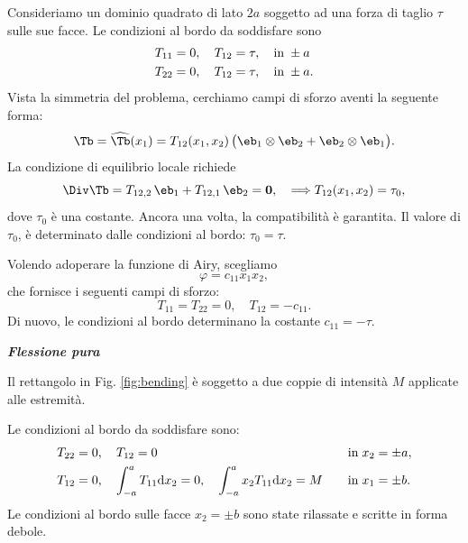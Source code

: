 Consideriamo un dominio quadrato di lato $2a$ soggetto ad una forza di taglio $\tau$ sulle sue facce.  Le condizioni al bordo da soddisfare sono
\begin{equation}
	\begin{aligned}
		&T_{11}=0, \quad T_{12}=\tau, \quad {\rm in}\; \pm a \\
		& T_{22}=0, \quad T_{12}=\tau, \quad {\rm in}\; \pm a.
	\end{aligned}
\end{equation}
Vista la simmetria del problema, cerchiamo  campi di sforzo aventi la seguente forma:
\begin{equation}
	\Tb=\widehat\Tb(x_1)=T_{12}(x_1,x_2)\,\big(\eb_1\otimes\eb_2+\eb_2\otimes\eb_1\big).
\end{equation}
La condizione di equilibrio locale richiede
\begin{equation}
	\Div\Tb=T_{12,2}\,\eb_1+T_{12,1}\,\eb_2=\mathbf{0}, \quad \Longrightarrow T_{12}(x_1, x_2)=\tau_0,
\end{equation}
dove $\tau_0$ è una costante. Ancora una volta, la compatibilità è garantita. Il valore di $\tau_0$, è determinato dalle condizioni al bordo: $\tau_0=\tau$.

Volendo adoperare la funzione di Airy, scegliamo
\begin{equation}
	\varphi=c_{11}x_1x_2,
\end{equation}
che fornisce i seguenti campi di sforzo:
\begin{equation}
	T_{11}=T_{22}=0, \quad T_{12}=-c_{11}.
\end{equation}
Di nuovo, le condizioni al bordo determinano la costante $c_{11}=-\tau$.



\vspace{.5cm}

\noindent\textsf{\small\textit{\textbf{Flessione pura}}}

Il rettangolo in Fig. \eqref{fig:bending} è soggetto a due coppie di intensità $M$ applicate alle estremità.

Le condizioni al bordo da soddisfare sono:
\begin{equation}\label{bendingbc}
	\begin{aligned}
		&T_{22}=0, \quad T_{12}=0 \quad &&{\rm in}\; x_2=\pm a, \\
		&T_{12}=0, \quad \int_{-a}^{a}T_{11}{\rm d}x_2=0, \quad \int_{-a}^{a}x_2T_{11}{\rm d}x_2=M \quad &&{\rm in}\; x_1=\pm b.
	\end{aligned}
\end{equation}
Le condizioni al bordo sulle facce $x_2=\pm b$ sono state rilassate e scritte in forma debole. 

